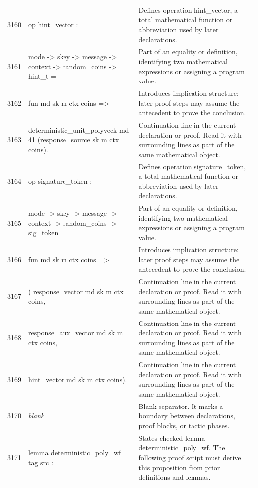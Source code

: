 \documentclass[10pt]{article}
\begin{document}
\begin{longtable}{r L{0.53\textwidth} L{0.37\textwidth}}
3160 & {\ttfamily\scriptsize op hint\_vector :} & Defines operation hint\_vector, a total mathematical function or abbreviation used by later declarations. \\
3161 & {\ttfamily\scriptsize   mode -> skey -> message -> context -> random\_coins -> hint\_t =} & Part of an equality or definition, identifying two mathematical expressions or assigning a program value. \\
3162 & {\ttfamily\scriptsize   fun md sk m ctx coins =>} & Introduces implication structure: later proof steps may assume the antecedent to prove the conclusion. \\
3163 & {\ttfamily\scriptsize     deterministic\_unit\_polyveck md 41 (response\_source sk m ctx coins).} & Continuation line in the current declaration or proof.  Read it with surrounding lines as part of the same mathematical object. \\
3164 & {\ttfamily\scriptsize op signature\_token :} & Defines operation signature\_token, a total mathematical function or abbreviation used by later declarations. \\
3165 & {\ttfamily\scriptsize   mode -> skey -> message -> context -> random\_coins -> sig\_token =} & Part of an equality or definition, identifying two mathematical expressions or assigning a program value. \\
3166 & {\ttfamily\scriptsize   fun md sk m ctx coins =>} & Introduces implication structure: later proof steps may assume the antecedent to prove the conclusion. \\
3167 & {\ttfamily\scriptsize     ( response\_vector md sk m ctx coins,} & Continuation line in the current declaration or proof.  Read it with surrounding lines as part of the same mathematical object. \\
3168 & {\ttfamily\scriptsize       response\_aux\_vector md sk m ctx coins,} & Continuation line in the current declaration or proof.  Read it with surrounding lines as part of the same mathematical object. \\
3169 & {\ttfamily\scriptsize       hint\_vector md sk m ctx coins).} & Continuation line in the current declaration or proof.  Read it with surrounding lines as part of the same mathematical object. \\
3170 & {\ttfamily\scriptsize \emph{blank}} & Blank separator.  It marks a boundary between declarations, proof blocks, or tactic phases. \\
3171 & {\ttfamily\scriptsize lemma deterministic\_poly\_wf tag src :} & States checked lemma deterministic\_poly\_wf.  The following proof script must derive this proposition from prior definitions and lemmas. \\

\end{longtable}
\end{document}
